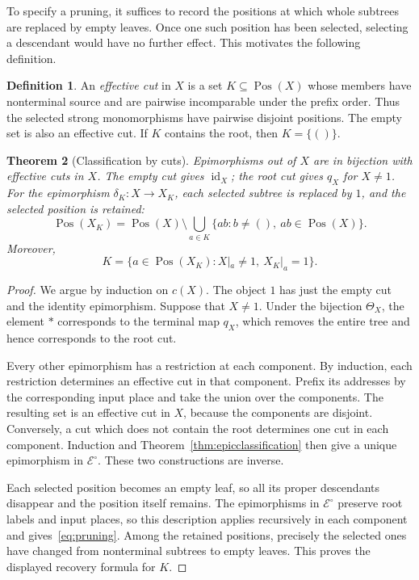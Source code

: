 \documentclass[11pt,a4paper]{article}
\theoremstyle{plain}
\newtheorem{theorem}{Theorem}[section]
\theoremstyle{definition}
\newtheorem{definition}[theorem]{Definition}
\theoremstyle{remark}
\newcommand{\Icat}{\mathcal E^\circ}
\newcommand{\one}{1}
\newcommand{\id}{\operatorname{id}}
\newcommand{\Pos}{\operatorname{Pos}}
\newcommand{\emptyword}{()}
\begin{document}
To specify a pruning, it suffices to record the positions at which
whole subtrees are replaced by empty leaves. Once one such position
has been selected, selecting a descendant would have no further
effect. This motivates the following definition.
\begin{definition}\label{def:effective-cut}
An \emph{effective cut} in $X$ is a set $K\subseteq\Pos(X)$
whose members have nonterminal source and are pairwise incomparable
under the prefix order. Thus the selected strong monomorphisms
have pairwise disjoint positions. The empty set is also an effective cut.
If $K$ contains the root, then $K=\{\emptyword\}$.
\end{definition}

\begin{theorem}[Classification by cuts]\label{thm:cuts}
Epimorphisms out of $X$ are in bijection with effective cuts in $X$.
The empty cut gives $\id_X$; the root cut gives $q_X$ for $X\ne\one$.
For the epimorphism $\delta_K:X\to X_K$, each selected subtree is
replaced by $\one$, and the selected position is retained:
\begin{equation}\label{eq:pruning}
 \Pos(X_K)=\Pos(X)\setminus
 \bigcup_{a\in K}\{ab:b\ne\emptyword,\ ab\in\Pos(X)\}.
\end{equation}
Moreover,
\[
K=\{a\in\Pos(X_K):X|_a\ne\one,\ X_K|_a=\one\}.
\]
\end{theorem}
\begin{proof}
We argue by induction on $c(X)$. The object $\one$ has just
the empty cut and the identity epimorphism. Suppose that
$X\ne\one$. Under the bijection $\Theta_X$, the element $*$
corresponds to the terminal map $q_X$, which removes the entire
tree and hence corresponds to the root cut.

Every other epimorphism has a restriction at each component.
By induction, each restriction determines an effective cut in
that component. Prefix its addresses by the corresponding input
place and take the union over the components. The resulting set
is an effective cut in $X$, because the components are disjoint.
Conversely, a cut which does not contain the root determines one
cut in each component. Induction and
Theorem~\ref{thm:epicclassification} then give a unique
epimorphism in $\Icat$. These two constructions are inverse.

Each selected position becomes an empty leaf, so all its proper
descendants disappear and the position itself remains. The
epimorphisms in $\Icat$ preserve root labels and input places,
so this description applies recursively in each component and
gives~\eqref{eq:pruning}. Among the retained positions, precisely
the selected ones have changed from nonterminal subtrees to
empty leaves. This proves the displayed recovery formula for $K$.
\end{proof}
\end{document}
